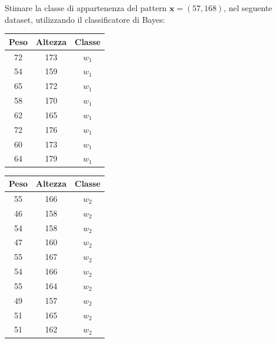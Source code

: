 \documentclass{article}
\numberwithin{equation}{section}
\newcommand{\vect}[1]{\boldsymbol{\mathbf{#1}}}
\begin{document}
Stimare la classe di appartenenza del pattern $\vect{x}=(57,168)$, nel seguente dataset, utilizzando il classificatore di Bayes:
\begin{center}
    \begin{tabular}{|c|c|c|}
        \hline
        Peso&Altezza&Classe\\\hline
        72&173&$w_1$\\\hline
        54&159&$w_1$\\\hline
        65&172&$w_1$\\\hline
        58&170&$w_1$\\\hline
        62&165&$w_1$\\\hline
        72&176&$w_1$\\\hline
        60&173&$w_1$\\\hline
        64&179&$w_1$\\\hline
    \end{tabular}
    \begin{tabular}{|c|c|c|}
        \hline
        Peso&Altezza&Classe\\\hline
        55&166&$w_2$\\\hline
        46&158&$w_2$\\\hline
        54&158&$w_2$\\\hline
        47&160&$w_2$\\\hline
        55&167&$w_2$\\\hline
        54&166&$w_2$\\\hline
        55&164&$w_2$\\\hline
        49&157&$w_2$\\\hline
        51&165&$w_2$\\\hline
        51&162&$w_2$\\\hline
    \end{tabular}
\end{center}
\end{document}
